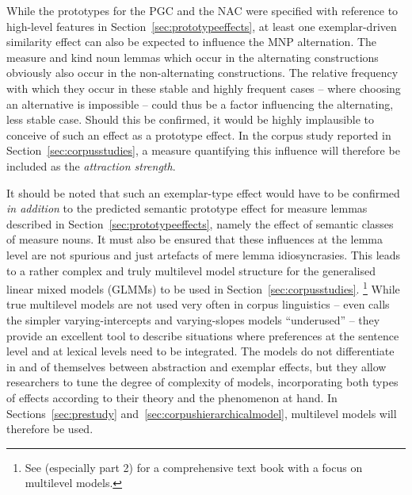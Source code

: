 While the prototypes for the PGC and the NAC were specified with reference to high-level features in Section~\ref{sec:prototypeeffects}, at least one exemplar-driven similarity effect can also be expected to influence the MNP alternation.
The measure and kind noun lemmas which occur in the alternating constructions obviously also occur in the non-alternating constructions.
The relative frequency with which they occur in these stable and highly frequent cases -- where choosing an alternative is impossible -- could thus be a factor influencing the alternating, less stable case.
Should this be confirmed, it would be highly implausible to conceive of such an effect as a prototype effect.
In the corpus study reported in Section~\ref{sec:corpusstudies}, a measure quantifying this influence will therefore be included as the \textit{attraction strength}.

It should be noted that such an exemplar-type effect would have to be confirmed \textit{in addition} to the predicted semantic prototype effect for measure lemmas described in Section~\ref{sec:prototypeeffects}, namely the effect of semantic classes of measure nouns.
It must also be ensured that these influences at the lemma level are not spurious and just artefacts of mere lemma idiosyncrasies.
This leads to a rather complex and truly multilevel model structure for the generalised linear mixed models (GLMMs) to be used in Section~\ref{sec:corpusstudies}.%
\footnote{See \citet{GelmanHill2006} (especially part 2) for a comprehensive text book with a focus on multilevel models.}
While true multilevel models are not used very often in corpus linguistics -- \citet{Gries2015} even calls the simpler varying-intercepts and varying-slopes models ``underused'' -- they provide an excellent tool to describe situations where preferences at the sentence level and at lexical levels need to be integrated.
The models do not differentiate in and of themselves between abstraction and exemplar effects, but they allow researchers to tune the degree of complexity of models, incorporating both types of effects according to their theory and the phenomenon at hand.
In Sections~\ref{sec:prestudy} and~\ref{sec:corpushierarchicalmodel}, multilevel models will therefore be used.
